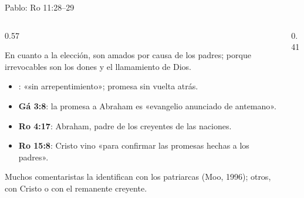 \begin{frame}{Pablo: Ro 11:28--29}
\begin{columns}[c,onlytextwidth]
\begin{column}{0.57\textwidth}
\begin{cita}En cuanto a la elección, son amados por causa de los padres; porque irrevocables son los dones y el llamamiento de Dios.\end{cita}
\scriptsize
\begin{itemize}
\setlength{\itemsep}{0pt}
\item {}: «sin arrepentimiento»; promesa sin vuelta atrás.
\item \textbf{Gá 3:8}: la promesa a Abraham es «evangelio anunciado de antemano».
\item \textbf{Ro 4:17}: Abraham, padre de los creyentes de las naciones.
\item \textbf{Ro 15:8}: Cristo vino «para confirmar las promesas hechas a los padres».
\end{itemize}
\begin{notalam}
Muchos comentaristas la identifican con los patriarcas (Moo, 1996); otros, con Cristo o con el remanente creyente.
\end{notalam}
\end{column}
\begin{column}{0.41\textwidth}\end{column}
\end{columns}
\end{frame}

